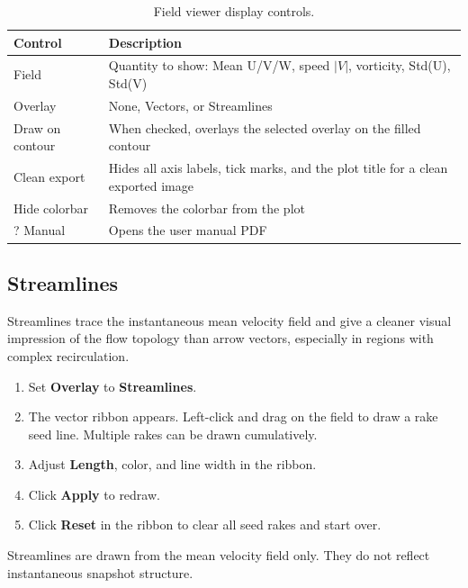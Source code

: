 \documentclass[11pt, a4paper]{report}
\newcommand{\uipth}[1]{\textbf{\textcolor{upblue}{#1}}}
\begin{document}
\begin{table}[htbp]
\centering
\caption{Field viewer display controls.}
\begin{tabular}{lp{9cm}}
\toprule
\textbf{Control} & \textbf{Description} \\
\midrule
Field         & Quantity to show: Mean U/V/W, speed $|V|$, vorticity, Std(U), Std(V) \\
Overlay       & None, Vectors, or Streamlines \\
Draw on contour & When checked, overlays the selected overlay on the filled contour \\
Clean export  & Hides all axis labels, tick marks, and the plot title for a clean exported image \\
Hide colorbar & Removes the colorbar from the plot \\
? Manual      & Opens the user manual PDF \\
\bottomrule
\end{tabular}
\end{table}

\subsection{Streamlines}

Streamlines trace the instantaneous mean velocity field and give a cleaner visual impression of the flow topology than arrow vectors, especially in regions with complex recirculation.

\begin{stepbox}
\begin{enumerate}[leftmargin=1.5em, topsep=2pt]
  \item Set \uipth{Overlay} to \uipth{Streamlines}.
  \item The vector ribbon appears. Left-click and drag on the field to draw a rake seed line. Multiple rakes can be drawn cumulatively.
  \item Adjust \uipth{Length}, color, and line width in the ribbon.
  \item Click \uipth{Apply} to redraw.
  \item Click \uipth{Reset} in the ribbon to clear all seed rakes and start over.
\end{enumerate}
\end{stepbox}

\begin{notebox}
Streamlines are drawn from the mean velocity field only. They do not reflect instantaneous snapshot structure.
\end{notebox}
\end{document}
